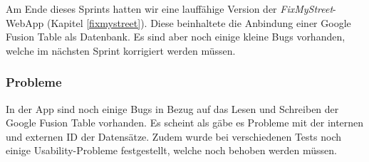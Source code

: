 Am Ende dieses Sprints hatten wir eine lauffähige Version der \emph{FixMyStreet}-WebApp (Kapitel \ref{fixmystreet}). Diese beinhaltete die Anbindung einer Google Fusion Table als Datenbank. Es sind aber noch einige kleine Bugs vorhanden, welche im nächsten Sprint korrigiert werden müssen.

\subsubsection{Probleme}
In der App sind noch einige Bugs in Bezug auf das Lesen und Schreiben der Google Fusion Table vorhanden. Es scheint als gäbe es Probleme mit der internen und externen ID der Datensätze. Zudem wurde bei verschiedenen Tests noch einige Usability-Probleme festgestellt, welche noch behoben werden müssen.